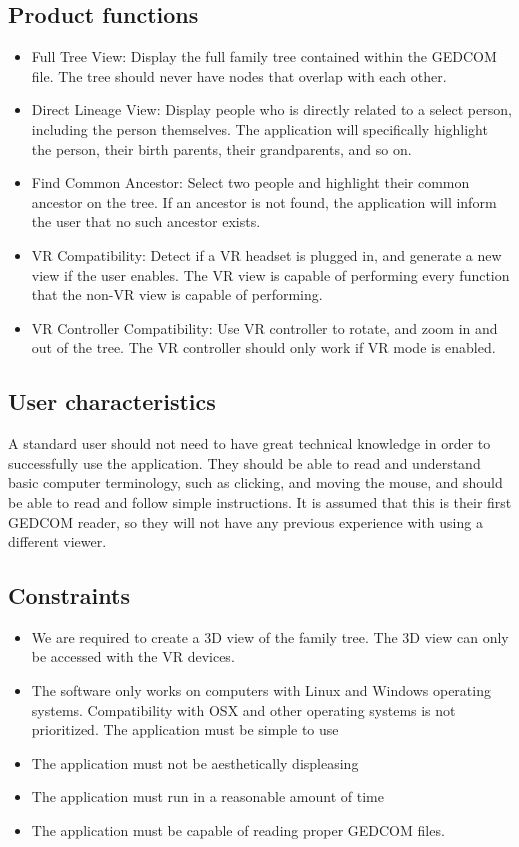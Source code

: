 \documentclass[onecolumn, draftclsnofoot, 10pt, compsoc]{IEEEtran}
\begin{document}
\subsection{Product functions}
\begin{itemize}
\item Full Tree View: Display the full family tree contained within the GEDCOM file. The tree should never have nodes that overlap with each other.
\item Direct Lineage View: Display people who is directly related to a select person, including the person themselves. The application will specifically highlight the person, their birth parents, their grandparents, and so on.
\item Find Common Ancestor: Select two people and highlight their common ancestor on the tree. If an ancestor is not found, the application will inform the user that no such ancestor exists.
\item VR Compatibility: Detect if a VR headset is plugged in, and generate a new view if the user enables. The VR view is capable of performing every function that the non-VR view is capable of performing.
\item VR Controller Compatibility: Use VR controller to rotate, and zoom in and out of the tree. The VR controller should only work if VR mode is enabled.

\end{itemize}

\subsection{User characteristics}
\begin{singlespace}
	A standard user should not need to have great technical knowledge in order to successfully use the application. They should be able to read and understand basic computer terminology, such as clicking, and moving the mouse, and should be able to read and follow simple instructions. It is assumed that this is their first GEDCOM reader, so they will not have any previous experience with using a different viewer.
\end{singlespace}

\subsection{Constraints}
\begin{itemize}
\item We are required to create a 3D view of the family tree. The 3D view can only be accessed with the VR devices. 
\item The software only works on computers with Linux and Windows operating systems. Compatibility with OSX and other operating systems is not prioritized. The application must be simple to use
\item The application must not be aesthetically displeasing
\item The application must run in a reasonable amount of time
\item The application must be capable of reading proper GEDCOM files.
\end{itemize}
\end{document}
